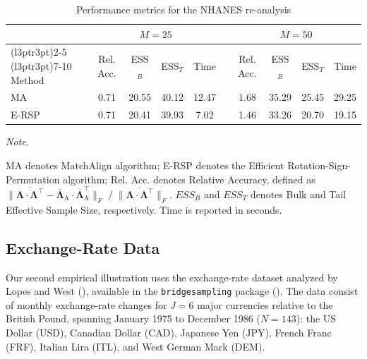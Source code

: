 \documentclass[
  man,
  longtable,
  nolmodern,
  notxfonts,
  notimes,
  colorlinks=true,linkcolor=blue,citecolor=blue,urlcolor=blue]{apa7}
\theoremstyle{plain}
\theoremstyle{plain}
\theoremstyle{remark}
\begin{document}
\begin{table}
\centering
\caption{\label{tab:NHANES_res}Performance metrics for the NHANES re-analysis}
\centering
\begin{threeparttable}
\begin{tabular}[t]{lccccccccc}
\toprule
\multicolumn{1}{c}{ } & \multicolumn{4}{c}{$M = 25$} & \multicolumn{1}{c}{ } & \multicolumn{4}{c}{$M = 50$} \\
\cmidrule(l{3pt}r{3pt}){2-5} \cmidrule(l{3pt}r{3pt}){7-10}
Method & Rel. Acc. & ESS$_B$ & ESS$_T$ & Time &  & Rel. Acc. & ESS$_B$ & ESS$_T$ & Time\\
\midrule
MA & 0.71 & 20.55 & 40.12 & 12.47 &  & 1.68 & 35.29 & 25.45 & 29.25\\
E-RSP & 0.71 & 20.41 & 39.93 & 7.02 &  & 1.46 & 33.26 & 20.70 & 19.15\\
\bottomrule
\end{tabular}
\begin{tablenotes}
\item \textit{Note.} 
\item MA denotes MatchAlign algorithm; E-RSP denotes the Efficient Rotation-Sign-Permutation algorithm; Rel. Acc. denotes Relative Accuracy, defined as $\|\overline{\mathbf\Lambda\cdot\mathbf\Lambda^\top} - \overline{\mathbf\Lambda}_{\text{A}}\cdot\overline{\mathbf\Lambda}_{\text{A}}^\top\|_{F} \;/\; \|\overline{\mathbf\Lambda\cdot\mathbf\Lambda^\top}\|_F$. $\textstyle{ESS}_{B}$ and $\textstyle{ESS}_{T}$ denotes Bulk and Tail Effective Sample Size, respectively. Time is reported in seconds.
\end{tablenotes}
\end{threeparttable}
\end{table}

\subsection{Exchange-Rate Data}\label{exchange-rate-data}

Our second empirical illustration uses the exchange-rate dataset
analyzed by Lopes and West (),
available in the \texttt{bridgesampling} package
(). The data consist of
monthly exchange-rate changes for \(J=6\) major currencies relative to
the British Pound, spanning January 1975 to December 1986 (\(N=143\)):
the US Dollar (USD), Canadian Dollar (CAD), Japanese Yen (JPY), French
Franc (FRF), Italian Lira (ITL), and West German Mark (DEM).
\end{document}
